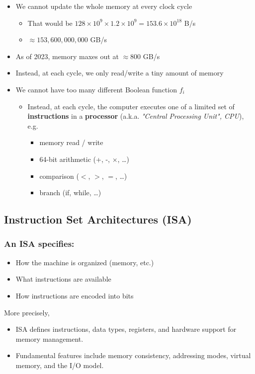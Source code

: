 \documentclass[12pt]{article}
\begin{document}
\begin{itemize}
  \item We cannot update the whole memory at every clock cycle
  \begin{itemize}
    \item That would be $128 \times 10^9 \times 1.2 \times 10^9 = 153.6 \times 10^{18}$ B/s
    \item $\approx 153,600,000,000$ GB/s
  \end{itemize}
  \item As of 2023, memory maxes out at $\approx 800$ GB/s
  \item Instead, at each cycle, we only read/write a tiny amount of memory
  \item We cannot have too many different Boolean function $f_i$
  \begin{itemize}
    \item Instead, at each cycle, the computer executes one of a limited set of \textbf{instructions} in a \textbf{processor} (a.k.a. \textsl{"Central Processing Unit", CPU}), e.g.
    \begin{itemize}
      \item memory read / write
      \item 64-bit arithmetic (+, -, $\times$, \ldots)
      \item comparison ($<$, $>$, $=$, \ldots)
      \item branch (if, while, \ldots)
    \end{itemize}
  \end{itemize}
\end{itemize}

\subsection{Instruction Set Architectures (ISA)}
\subsubsection{An ISA specifies:}
\begin{itemize}
    \item How the machine is organized (memory, etc.)
    \item What instructions are available
    \item How instructions are encoded into bits
\end{itemize}
More precisely,
\begin{itemize}
    \item ISA defines instructions, data types, registers, and hardware support for memory management.
    \item Fundamental features include memory consistency, addressing modes, virtual memory, and the I/O model.
\end{itemize}
\end{document}
